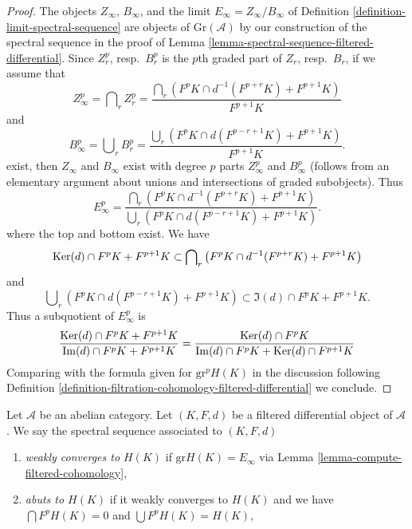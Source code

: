 \begin{proof}
The objects $Z_\infty$, $B_\infty$, and the limit
$E_\infty = Z_\infty/B_\infty$ of
Definition \ref{definition-limit-spectral-sequence}
are objects of $\text{Gr}(\mathcal{A})$ by our construction of
the spectral sequence in the proof of
Lemma \ref{lemma-spectral-sequence-filtered-differential}.
Since $Z_r^p$, resp.\ $B_r^p$ is the $p$th graded part of $Z_r$, resp.\  $B_r$,
if we assume that
$$
Z_\infty^p = \bigcap\nolimits_r Z_r^p =
\frac{\bigcap_r (F^pK \cap d^{-1}(F^{p + r}K) + F^{p + 1}K)}{F^{p + 1}K}
$$
and
$$
B_\infty^p = \bigcup\nolimits_r B_r^p =
\frac{\bigcup_r (F^pK \cap d(F^{p - r + 1}K) + F^{p + 1}K)}{F^{p + 1}K}.
$$
exist, then $Z_\infty$ and $B_\infty$ exist with degree $p$ parts
$Z_\infty^p$ and $B_\infty^p$ (follows from an elementary argument
about unions and intersections of graded subobjects). Thus
$$
E_\infty^p =
\frac{\bigcap_r (F^pK \cap d^{-1}(F^{p + r}K) + F^{p + 1}K)}
{\bigcup_r (F^pK \cap d(F^{p - r + 1}K) + F^{p + 1}K)}.
$$
where the top and bottom exist. We have
\begin{equation}
\label{equation-on-top}
\mathop{\mathrm{Ker}}(d) \cap F^pK + F^{p + 1}K
\subset
\bigcap\nolimits_r \left(F^pK \cap d^{-1}(F^{p + r}K) + F^{p + 1}K\right)
\end{equation}
and
\begin{equation}
\label{equation-at-bottom}
\bigcup\nolimits_r \left(F^pK \cap d(F^{p - r + 1}K) + F^{p + 1}K\right)
\subset
\Im(d) \cap F^pK + F^{p + 1}K.
\end{equation}
Thus a subquotient of $E_\infty^p$ is
$$
\frac{\mathop{\mathrm{Ker}}(d) \cap F^pK + F^{p + 1}K}{\mathop{\mathrm{Im}}(d) \cap F^pK + F^{p + 1}K} =
\frac{\mathop{\mathrm{Ker}}(d) \cap F^pK}{\mathop{\mathrm{Im}}(d) \cap F^pK + \mathop{\mathrm{Ker}}(d) \cap F^{p + 1}K}
$$
Comparing with the formula given for $\text{gr}^pH(K)$ in the discussion
following
Definition \ref{definition-filtration-cohomology-filtered-differential}
we conclude.
\end{proof}

\begin{definition}
\label{definition-filtered-differential-ss-converges}
Let $\mathcal{A}$ be an abelian category.
Let $(K, F, d)$ be a filtered differential object of $\mathcal{A}$.
We say the spectral sequence associated to $(K, F, d)$
\begin{enumerate}
\item {\it weakly converges to $H(K)$} if $\text{gr}H(K) = E_{\infty}$
via Lemma \ref{lemma-compute-filtered-cohomology},
\item {\it abuts to $H(K)$} if it weakly converges to $H(K)$ and
we have $\bigcap F^pH(K) = 0$ and $\bigcup F^pH(K) = H(K)$,
\end{enumerate}
\end{definition}

